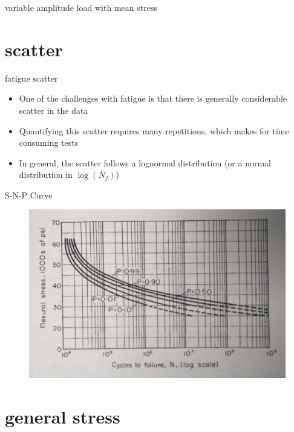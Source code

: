 \documentclass[10pt]{beamer}
\begin{document}
\begin{frame}{variable amplitude load with mean stress}
\end{frame}

\section{scatter}

\begin{frame}{fatigue scatter}
	\begin{itemize}[<+->]
		\item One of the challenges with fatigue is that there is generally considerable scatter in the data
		\item Quantifying this scatter requires many repetitions, which makes for time consuming tests
		\item In general, the scatter follows a lognormal distribution (or a normal distribution in $\log(N_f)$)
	\end{itemize}
\end{frame}

\begin{frame}{S-N-P Curve}
\begin{figure}
\centering
\includegraphics[width=0.7\linewidth]{../Figures/S-N-P}
\label{fig:S-N-P}
\end{figure}
\end{frame}

\section{general stress}
\end{document}

